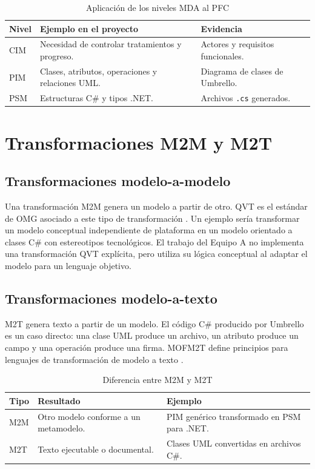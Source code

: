 \begin{table}[H]
\centering
\caption{Aplicación de los niveles MDA al PFC}
\begin{tabularx}{\textwidth}{C{2.2cm}L{5cm}X}
\toprule
\textbf{Nivel} & \textbf{Ejemplo en el proyecto} & \textbf{Evidencia} \\
\midrule
CIM & Necesidad de controlar tratamientos y progreso. & Actores y requisitos funcionales. \\
PIM & Clases, atributos, operaciones y relaciones UML. & Diagrama de clases de Umbrello. \\
PSM & Estructuras C\# y tipos .NET. & Archivos \texttt{.cs} generados. \\
\bottomrule
\end{tabularx}
\end{table}

\section{Transformaciones M2M y M2T}
\subsection{Transformaciones modelo-a-modelo}
Una transformación M2M genera un modelo a partir de otro. QVT es el estándar de OMG asociado a este tipo de transformación \cite{OMG2016QVT}. Un ejemplo sería transformar un modelo conceptual independiente de plataforma en un modelo orientado a clases C\# con estereotipos tecnológicos. El trabajo del Equipo A no implementa una transformación QVT explícita, pero utiliza su lógica conceptual al adaptar el modelo para un lenguaje objetivo.

\subsection{Transformaciones modelo-a-texto}
M2T genera texto a partir de un modelo. El código C\# producido por Umbrello es un caso directo: una clase UML produce un archivo, un atributo produce un campo y una operación produce una firma. MOFM2T define principios para lenguajes de transformación de modelo a texto \cite{OMG2008MOFM2T}.

\begin{table}[H]
\centering
\caption{Diferencia entre M2M y M2T}
\begin{tabularx}{\textwidth}{L{3cm}L{5.2cm}X}
\toprule
\textbf{Tipo} & \textbf{Resultado} & \textbf{Ejemplo} \\
\midrule
M2M & Otro modelo conforme a un metamodelo. & PIM genérico transformado en PSM para .NET. \\
M2T & Texto ejecutable o documental. & Clases UML convertidas en archivos C\#. \\
\bottomrule
\end{tabularx}
\end{table}

